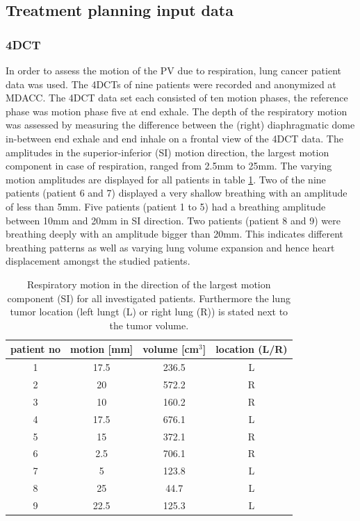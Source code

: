 \documentclass[type=dr, dr=rernat, accentcolor=tud7b,colorbacktitle, bigchapter, openright, twoside, 12pt ]{tudthesis}
\begin{document}
\subsection{Treatment planning input data}

\subsubsection{4DCT}
In order to assess the motion of the PV due to respiration, lung cancer patient data was used. The 4DCTs of nine patients were recorded and 
anonymized at MDACC. The 4DCT data set each consisted of ten motion phases, the reference phase was 
motion phase five at end exhale. The depth of the respiratory motion was assessed by measuring the difference between the (right) diaphragmatic dome in-between 
end exhale and end inhale on a frontal view of the 4DCT data. The amplitudes in the superior-inferior (SI) motion direction, the 
largest motion component in case of respiration, ranged from 2.5mm to 25mm. The varying motion amplitudes are displayed for all patients in 
table \ref{tab:patdata}. Two of the nine patients (patient 6 and 7) displayed a very shallow breathing with an amplitude of less than 5mm. 
Five patients (patient 1 to 5) had a breathing amplitude between 10mm and 20mm in SI direction. Two patients (patient 8 and 9) were breathing 
deeply with an amplitude bigger than 20mm. This indicates different breathing patterns as well as varying lung volume 
expansion and hence heart displacement amongst the studied patients. 


\begin{table}[htbp]
  \centering
  \caption{Respiratory motion in the direction of the largest motion component (SI) for all investigated patients. Furthermore the lung tumor 
  location (left lungt (L) or right lung (R)) is stated next to the tumor volume.}
  \begin{tabular}{|c|c|c|c|}
    \hline\hline
    patient no & motion [mm] & volume [cm$^{3}$] & location (L/R)\\
    \hline
    1 & 17.5 & 236.5 & L \\
    2 & 20 & 572.2 & R \\
    3 & 10 & 160.2 & R \\
    4 & 17.5 & 676.1 & L \\
    5 & 15 & 372.1 & R \\
    6 & 2.5 & 706.1 & R \\
    7 & 5 & 123.8 & L \\
    8 & 25 & 44.7 & L \\
    9 & 22.5 & 125.3 & L \\
    \hline\hline
  \end{tabular}
  \label{tab:patdata}
\end{table}
\end{document}

